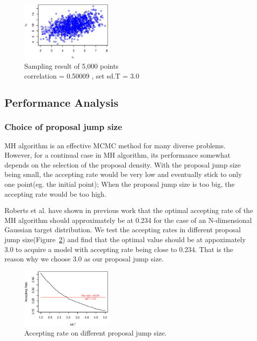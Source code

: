 \begin{figure}[tb]
\vspace{-0.5in}
  	\centering
  	\includegraphics[width=0.4\textwidth]{figure/sample_result.eps}
\vspace{-0.2in}
	\caption{Sampling result of 5,000 points \protect\\ correlation = 0.50009 , set sd.T = 3.0}
	\label{fig:sample_result}
\end{figure}




\subsection{Performance Analysis}

\subsubsection{Choice of proposal jump size}
MH algorithm is an effective MCMC method for many diverse problems. However, for a continual case in MH algorithm, its performance somewhat depends on the selection of the proposal density. With the proposal jump size being small, the accepting rate would be very low and eventually stick to only one point(eg. the initial point); When the proposal jump size is too big, the accepting rate would be too high. 

Roberts et al. have shown in previous work\cite{roberts1997weak} that the optimal accepting rate of the MH algorithm should approximately be at 0.234 for the case of an N-dimensional Gaussian target distribution. We test the accepting rates in different proposal jump size(Figure~\ref{fig:acc_sdt}) and find that the optimal value should be at appoximately 3.0 to acquire a model with accepting rate being close to 0.234. That is the reason why we choose 3.0 as our proposal jump size.

\begin{figure}[tb]
\vspace{-0.2in}
  	\centering
  	\includegraphics[width=0.4\textwidth]{figure/acc_sdt.eps}
\vspace{-0.2in}
	\caption{Accepting rate on different proposal jump size.}
	\label{fig:acc_sdt}
\end{figure}

